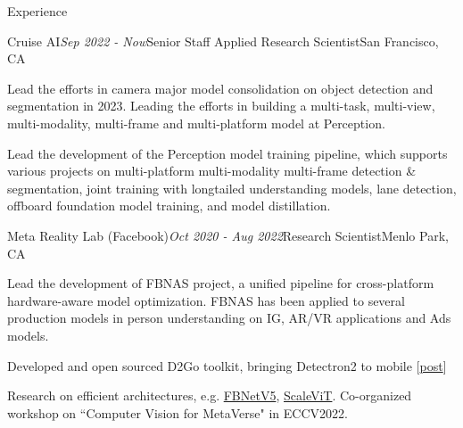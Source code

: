\documentclass{resume} %
\begin{document}
\begin{rSection}{Experience}

\begin{rSubsection}{Cruise AI}{\em Sep 2022 - Now}{Senior Staff Applied Research Scientist}{San Francisco, CA}
\item Lead the efforts in camera major model consolidation on object detection and segmentation in 2023. Leading the efforts in building a multi-task, multi-view, multi-modality, multi-frame and multi-platform model at Perception.
\item Lead the development of the Perception model training pipeline, which supports various projects on multi-platform multi-modality multi-frame detection \& segmentation, joint training with longtailed understanding models, lane detection, offboard foundation model training, and model distillation.
\end{rSubsection}

\begin{rSubsection}{Meta Reality Lab (Facebook)}{\em Oct 2020 - Aug 2022}{Research Scientist}{Menlo Park, CA} %
\item Lead the development of FBNAS project, a unified pipeline for cross-platform hardware-aware model optimization. FBNAS has been applied to several production models in person understanding on IG, AR/VR applications and Ads models.
\item Developed and open sourced D2Go toolkit, bringing Detectron2 to mobile [\href{https://ai.facebook.com/blog/d2go-brings-detectron2-to-mobile/}{post}]
\item Research on efficient architectures, e.g. \href{https://scholar.google.com/citations?view_op=view_citation&hl=en&user=gCoWdkUAAAAJ&sortby=pubdate&citation_for_view=gCoWdkUAAAAJ:ML0RJ9NH7IQC}{FBNetV5}, \href{https://scholar.google.com/citations?view_op=view_citation&hl=en&user=gCoWdkUAAAAJ&sortby=pubdate&citation_for_view=gCoWdkUAAAAJ:p__nRnzSRKYC}{ScaleViT}. Co-organized workshop on ``Computer Vision for MetaVerse" in ECCV2022.
\end{rSubsection}


\end{rSection}
\end{document}
